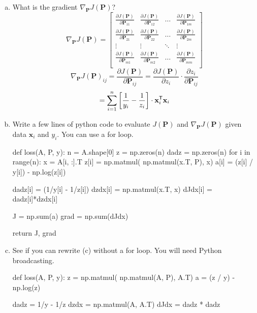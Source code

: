 \documentclass[11pt]{article}
\newcommand{\xbf}{\mathbf{x}}
\newcommand{\Pbf}{\mathbf{P}}
\newcommand{\tran}{^{\text{\sf T}}}
\begin{document}
\begin{enumerate}
\begin{enumerate}[(a)]
\item What is the gradient $\nabla_{\Pbf} J(\Pbf)$?
\[
	\nabla_{\Pbf} J(\Pbf) = \begin{bmatrix}
		\frac{\partial J(\Pbf)}{\partial \Pbf_{11}} & 
        \frac{\partial J(\Pbf)}{\partial \Pbf_{12}} & 
        \hdots & \frac{\partial J(\Pbf)}{\partial \Pbf_{1m}} \\
        \frac{\partial J(\Pbf)}{\partial \Pbf_{21}} & 
        \frac{\partial J(\Pbf)}{\partial \Pbf_{22}} & 
        \hdots & \frac{\partial J(\Pbf)}{\partial \Pbf_{2m}} \\
        \vdots & \vdots & \ddots & \vdots \\
        \frac{\partial J(\Pbf)}{\partial \Pbf_{m1}} & 
        \frac{\partial J(\Pbf)}{\partial \Pbf_{m2}} & 
        \hdots & \frac{\partial J(\Pbf)}{\partial \Pbf_{mm}} \\
							\end{bmatrix}
\]
\[
	\nabla_{\Pbf} J(\Pbf)_{ij} = \frac{\partial J(\Pbf)}{\partial \Pbf_{ij}} = 
    	\frac{\partial J(\Pbf)}{\partial z_i} \cdot
        \frac{\partial z_i}{\partial \Pbf_{ij}}
\]
\[
	= \sum_{i=1}^n \left[ \frac{1}{y_i} - \frac{1}{z_i} \right] \cdot \xbf_i\tran \xbf_i
\]
\item Write a few lines of python code to evaluate $J(\Pbf)$ and
$\nabla_{\Pbf} J(\Pbf)$ given data $\xbf_i$ and $y_i$.  You can use a for loop.


    
\begin{python}
def loss(A, P, y):
	n = A.shape[0]
	z = np.zeros(n)
	dadz = np.zeros(n)
	for i in range(n):
		x = A[i, :].T
		z[i] = np.matmul( np.matmul(x.T, P), x)
		a[i] = (z[i] / y[i]) - np.log(z[i])
		
		dadz[i] = (1/y[i] - 1/z[i])
		dzdx[i] = np.matmul(x.T, x)
		dJdx[i] = dadz[i]*dzdx[i]
        
	J = np.sum(a)
	grad = np.sum(dJdx)
	
	return J, grad
\end{python}

\item See if you can rewrite (c) without a for loop.  You will need Python broadcasting.

\begin{python}
def loss(A, P, y):
	z = np.matmul( np.matmul(A, P), A.T)
	a = (z / y) - np.log(z)
	
	dadz = 1/y - 1/z
	dzdx = np.matmul(A, A.T)
	dJdx = dadz * dadz
	

\end{python}
\end{enumerate}
\end{enumerate}
\end{document}
